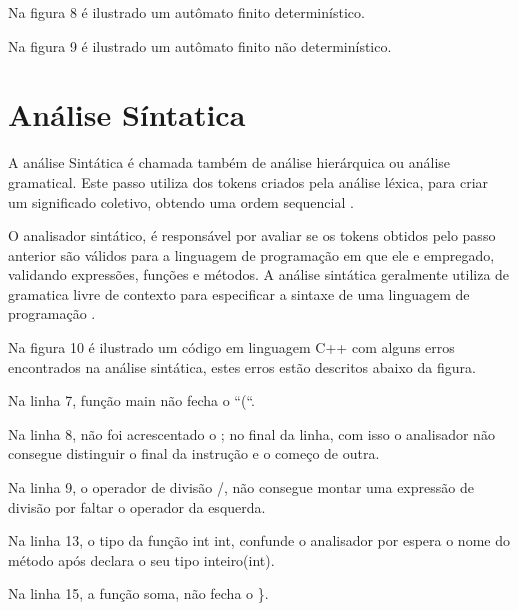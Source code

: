 \documentclass[12pt,oneside,a4paper,chapter=TITLE,section=TITLE,sumario=tradicional]{abntex2}
\begin{document}
Na figura 8 é ilustrado um autômato finito determinístico.

\begin{figure}[H]
\end{figure}

Na figura 9 é ilustrado um autômato finito não determinístico.

\begin{figure}[H]
\end{figure}

\section{Análise Síntatica}
\label{sec:analise-sintatica}

A análise Sintática é chamada também de análise hierárquica ou análise gramatical. Este passo utiliza dos tokens criados pela análise léxica, para criar um significado coletivo, obtendo uma ordem sequencial \cite{alfred1995}.

O analisador sintático, é responsável por avaliar se os tokens obtidos pelo passo anterior são válidos para a linguagem de programação em que ele e empregado, validando expressões, funções e métodos. A análise sintática geralmente utiliza de gramatica livre de contexto para especificar a sintaxe de uma linguagem de programação \cite{maragon2015}.

Na figura 10 é ilustrado um código em linguagem C++ com alguns erros encontrados na análise sintática, estes erros estão descritos abaixo da figura.

\begin{figure}[htb]
\end{figure}

\begin{lista}
	\item Na linha 7, função main não fecha o “(“.
	\item Na linha 8, não foi acrescentado o ; no final da linha, com isso o analisador não consegue distinguir o final da instrução e o começo de outra.
	\item Na linha 9, o operador de divisão /, não consegue montar uma expressão de divisão por faltar o operador da esquerda. 
	\item Na linha 13, o tipo da função int int, confunde o analisador por espera o nome do método após declara o seu tipo inteiro(int).
	\item Na linha 15, a função soma, não fecha o \}.
\end{lista}
\end{document}
